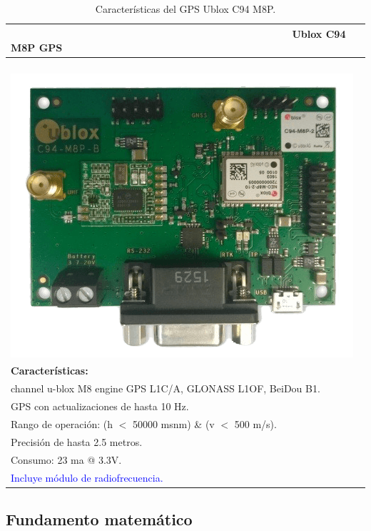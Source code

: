 \begin{table}[!htb]
\begin{center}
\caption{Características del GPS Ublox C94 M8P.}
\begin{tabular}{|l|}
	\hline
	\ \ \ \ \ \ \ \ \ \ \ \ \ \ \ \ \ \ \ \ \ \ \ \ \ \ \ \ \ \ \ \ \ \ \ \ \ \ \ \ \ \ \ \ \ \ \ \ \ \textbf{Ublox C94 M8P GPS}\\
	\hline
	      \ \ \ \ \ \ \ \ \ \ \ \ \ \ \ \ \ \ \ \ \ \ \ \ \ \ \ \ \ \ \ \ \ \ \ \ \ \ \ \ \includegraphics[width=0.37\linewidth]{Figures/ublox}\footnotemark
	\label{fig:ubx} \\
	\textbf{Características: }\\

		\tabitem 72 channel u-blox M8 engine GPS L1C/A, GLONASS L1OF, BeiDou B1.\\
		\tabitem GPS con actualizaciones de hasta 10 Hz.\\
		\tabitem Rango de operación: (h $<$ 50000 msnm) \& (v $<$ 500 m/s).\\
		\tabitem Precisión de hasta 2.5 metros.\\
		\tabitem Consumo: 23 ma @ 3.3V.\\
		\tabitem \textcolor{blue}{Incluye módulo de radiofrecuencia.}\\
	\hline
\end{tabular}
\end{center}
\end{table}


\FloatBarrier

\newpage

\subsection{Fundamento matemático}

